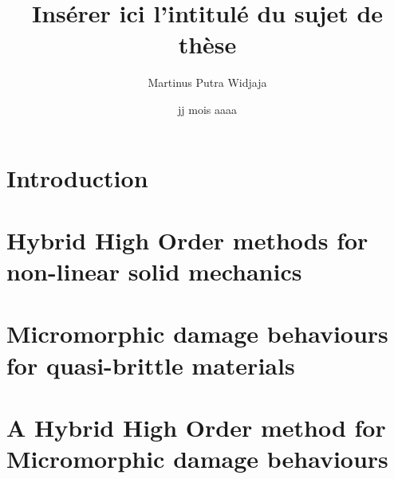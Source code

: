 \documentclass[a4paper, 11pt]{book}
\title{Insérer ici l'intitulé du sujet de thèse}
\author{Martinus Putra Widjaja}
\institute{MINES ParisTech}
\date{jj mois aaaa}
\begin{document}
\maketitle{}

\tableofcontents
\listoffigures

\chapter{Introduction}





\chapter{Hybrid High Order methods for non-linear solid mechanics}







% 
% 
% 
% 

\chapter{Micromorphic damage behaviours for quasi-brittle materials}





\chapter{A Hybrid High Order method for Micromorphic damage behaviours}






\end{document}
